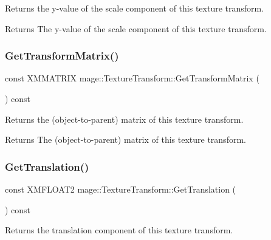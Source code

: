 Returns the y-\/value of the scale component of this texture transform.

\begin{DoxyReturn}{Returns}
The y-\/value of the scale component of this texture transform. 
\end{DoxyReturn}
\hypertarget{structmage_1_1_texture_transform_adac9b7f5138ba53538b860cc83ad7e98}{}\label{structmage_1_1_texture_transform_adac9b7f5138ba53538b860cc83ad7e98} 
\subsubsection{\texorpdfstring{Get\+Transform\+Matrix()}{GetTransformMatrix()}}
{\footnotesize\ttfamily const X\+M\+M\+A\+T\+R\+IX mage\+::\+Texture\+Transform\+::\+Get\+Transform\+Matrix (\begin{DoxyParamCaption}{ }\end{DoxyParamCaption}) const\hspace{0.3cm}{\ttfamily [noexcept]}}

Returns the (object-\/to-\/parent) matrix of this texture transform.

\begin{DoxyReturn}{Returns}
The (object-\/to-\/parent) matrix of this texture transform. 
\end{DoxyReturn}
\hypertarget{structmage_1_1_texture_transform_afbb9d000cc5062982d5c20af4c885acb}{}\label{structmage_1_1_texture_transform_afbb9d000cc5062982d5c20af4c885acb} 
\subsubsection{\texorpdfstring{Get\+Translation()}{GetTranslation()}}
{\footnotesize\ttfamily const X\+M\+F\+L\+O\+A\+T2 mage\+::\+Texture\+Transform\+::\+Get\+Translation (\begin{DoxyParamCaption}{ }\end{DoxyParamCaption}) const\hspace{0.3cm}{\ttfamily [noexcept]}}

Returns the translation component of this texture transform.

